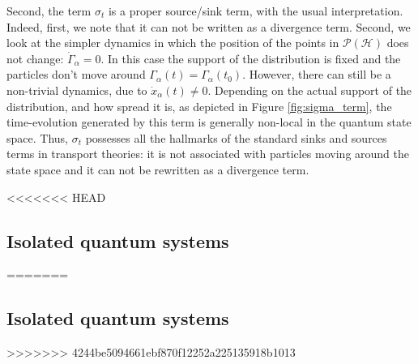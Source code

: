 \documentclass[draft,nofootinbib,pre,twocolumn,showpacs,showkeys,preprintnumbers,floatfix]{revtex4-1}
\newcommand{\1}{\mathbbm{1}}
\newcommand{\PH}{\mathcal{P}(\mathcal{H})}
\begin{document}
Second, the term $\sigma_t$ is a proper source/sink term, with the usual interpretation. Indeed, first, we note that it
can not be written as a divergence term. Second, we look at the simpler dynamics in which the position of the points 
in $\PH$ does not change: $\dot{\Gamma}_\alpha = 0$. In this case the support of the distribution is fixed and the 
particles don't move around $\Gamma_\alpha(t)=\Gamma_\alpha(t_0)$. However, there can still be a non-trivial 
dynamics, due to $\dot{x}_\alpha(t)\neq 0$. Depending on the actual support of the distribution, and how spread it is, 
as depicted in Figure \ref{fig:sigma_term}, the time-evolution generated by this term is generally non-local in the 
quantum state space. Thus, $\sigma_t$ possesses all the hallmarks of the standard sinks and sources terms in 
transport theories: it is not associated with particles moving around the state space and it can not be rewritten 
as a divergence term.

<<<<<<< HEAD
\subsection{Isolated quantum systems}\label{subsec:IQS}
=======
\subsection*{Isolated quantum systems}
>>>>>>> 4244be5094661ebf870f12252a225135918b1013
\end{document}
